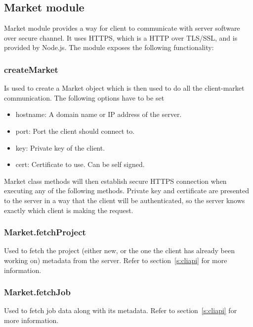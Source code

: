 \subsection{Market module}

Market module provides a way for client to communicate with server software over secure channel. It uses HTTPS, which is a HTTP over TLS/SSL, and is provided by Node.js. The module exposes the following functionality:

\subsubsection*{createMarket}

Is used to create a Market object which is then used to do all the client-market communication. The following options have to be set
\begin{itemize}
\item hostname: A domain name or IP address of the server.
\item port: Port the client should connect to.
\item key: Private key of the client.
\item cert: Certificate to use. Can be self signed.
\end{itemize}

Market class methods will then establish secure HTTPS connection when executing any of the following methods. Private key and certificate are presented to the server in a way that the client will be authenticated, so the server knows exactly which client is making the request.

\subsubsection*{Market.fetchProject}

Used to fetch the project (either new, or the one the client has already been working on) metadata from the server. Refer to section~\ref{s:cliapi} for more information.

\subsubsection*{Market.fetchJob}

Used to fetch job data along with its metadata. Refer to section~\ref{s:cliapi} for more information.


